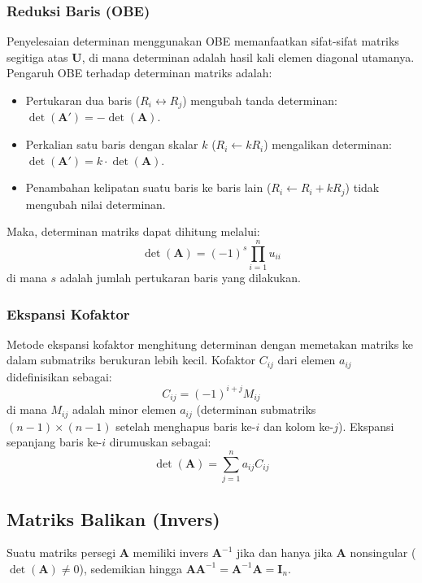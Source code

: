 \documentclass[12pt]{article}
\begin{document}
\begin{enumerate}
\subsubsection{Reduksi Baris (OBE)}
Penyelesaian determinan menggunakan OBE memanfaatkan sifat-sifat matriks segitiga atas $\mathbf{U}$, di mana determinan adalah hasil kali elemen diagonal utamanya. Pengaruh OBE terhadap determinan matriks adalah:
\begin{itemize}
    \item Pertukaran dua baris ($R_i \leftrightarrow R_j$) mengubah tanda determinan: $\det(\mathbf{A}') = -\det(\mathbf{A})$.
    \item Perkalian satu baris dengan skalar $k$ ($R_i \leftarrow k R_i$) mengalikan determinan: $\det(\mathbf{A}') = k \cdot \det(\mathbf{A})$.
    \item Penambahan kelipatan suatu baris ke baris lain ($R_i \leftarrow R_i + k R_j$) tidak mengubah nilai determinan.
\end{itemize}
Maka, determinan matriks dapat dihitung melalui:
\begin{equation}
    \det(\mathbf{A}) = (-1)^s \prod_{i=1}^{n} u_{ii}
\end{equation}
di mana $s$ adalah jumlah pertukaran baris yang dilakukan.

\subsubsection{Ekspansi Kofaktor}
Metode ekspansi kofaktor menghitung determinan dengan memetakan matriks ke dalam submatriks berukuran lebih kecil. Kofaktor $C_{ij}$ dari elemen $a_{ij}$ didefinisikan sebagai:
\begin{equation}
    C_{ij} = (-1)^{i+j} M_{ij}
\end{equation}
di mana $M_{ij}$ adalah minor elemen $a_{ij}$ (determinan submatriks $(n-1)\times(n-1)$ setelah menghapus baris ke-$i$ dan kolom ke-$j$). Ekspansi sepanjang baris ke-$i$ dirumuskan sebagai:
\begin{equation}
    \det(\mathbf{A}) = \sum_{j=1}^{n} a_{ij} C_{ij}
\end{equation}

\subsection{Matriks Balikan (Invers)}
Suatu matriks persegi $\mathbf{A}$ memiliki invers $\mathbf{A}^{-1}$ jika dan hanya jika $\mathbf{A}$ nonsingular ($\det(\mathbf{A}) \neq 0$), sedemikian hingga $\mathbf{A}\mathbf{A}^{-1} = \mathbf{A}^{-1}\mathbf{A} = \mathbf{I}_n$.


\end{enumerate}
\end{document}
